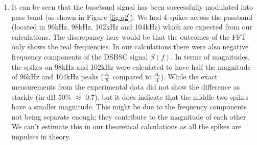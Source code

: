 \documentclass[11pt]{article}
\begin{document}
\begin{enumerate}[label=(\alph*)]
\newpage
\item %
It can be seen that the baseband signal has been successfully modulated into pass band (as shown in Figure \ref{fig:q2}). We had 4 spikes across the passband (located in 96kHz, 98kHz, 102kHz and 104kHz) which are expected from our calculations. The discrepancy here would be that the outcomes of the FFT only shows the real frequencies. In our calculations there were also negative frequency components of the DSBSC signal $S(f)$. In terms of magnitudes, the spikes on 98kHz and 102kHz were calculated to have half the magnitude of 96kHz and 104kHz peaks ($\frac{A_c}{8}$ compared to $\frac{A_c}{4}$). While the exact measurements from the experimental data did not show the difference as starkly (in dB 50\% $\approx$ 0.7). but it does indicate that the middle two spikes have a smaller magnitude. This might be due to the frequency components not being separate enough; they contribute to the magnitude of each other. We can't estimate this in our theoretical calculations as all the spikes are impulses in theory.


\end{enumerate}
\end{document}

